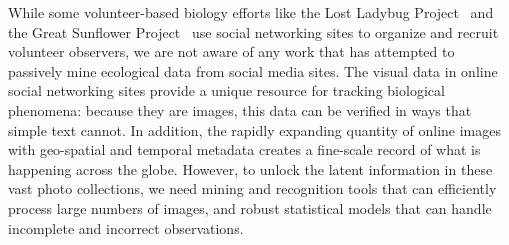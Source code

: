 While some volunteer-based biology efforts like the Lost Ladybug
Project~\cite{lostladybug} and the Great Sunflower
Project~\cite{greatsunflower} use social networking sites to
organize and recruit volunteer observers, we are not aware of any
work that has attempted to passively mine ecological data from social media
sites. The visual data in online social networking sites provide a
unique resource for tracking biological phenomena:  because they are
images, this data can be verified in ways that simple text 
cannot.  In addition, the rapidly expanding quantity
of online images with geo-spatial and temporal metadata creates a
fine-scale record of what is happening across the globe.  However, to
unlock the latent information in these vast photo collections, we need
 mining and recognition tools that can efficiently
process large numbers of images, and robust statistical models that
can handle incomplete and incorrect observations.


